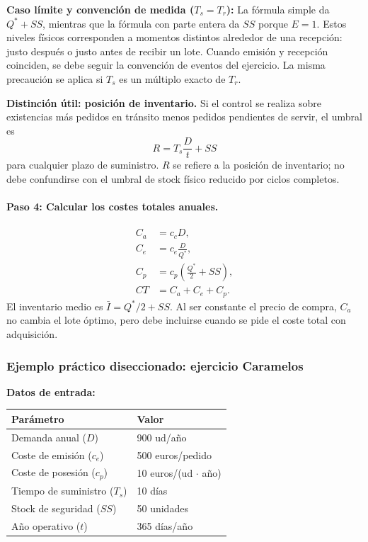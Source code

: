 \documentclass[11pt,a4paper]{article}
\begin{document}
\textbf{Caso límite y convención de medida ($T_s=T_r$):} La fórmula simple da $Q^{*}+SS$, mientras que la fórmula con parte entera da $SS$ porque $E=1$. Estos niveles físicos corresponden a momentos distintos alrededor de una recepción: justo después o justo antes de recibir un lote. Cuando emisión y recepción coinciden, se debe seguir la convención de eventos del ejercicio. La misma precaución se aplica si $T_s$ es un múltiplo exacto de $T_r$.

\textbf{Distinción útil: posición de inventario.} Si el control se realiza sobre existencias más pedidos en tránsito menos pedidos pendientes de servir, el umbral es
\[
    R=T_s\frac{D}{t}+SS
\]
para cualquier plazo de suministro. $R$ se refiere a la posición de inventario; no debe confundirse con el umbral de stock físico reducido por ciclos completos.

\paragraph{Paso 4: Calcular los costes totales anuales.}
\begin{align*}
    C_a & = c_c D,                              \\
    C_e & = c_e\frac{D}{Q^{*}},                 \\
    C_p & = c_p\left(\frac{Q^{*}}{2}+SS\right), \\
    CT  & = C_a+C_e+C_p.
\end{align*}
El inventario medio es $\bar{I}=Q^{*}/2+SS$. Al ser constante el precio de compra, $C_a$ no cambia el lote óptimo, pero debe incluirse cuando se pide el coste total con adquisición.

\subsubsection{Ejemplo práctico diseccionado: ejercicio Caramelos}
\textbf{Datos de entrada:}
\begin{center}
    \renewcommand{\arraystretch}{1.2}
    \begin{tabularx}{\textwidth}{@{}lX@{}}
        \toprule
        Parámetro                    & Valor                     \\
        \midrule
        Demanda anual ($D$)          & 900 ud/año                \\
        Coste de emisión ($c_e$)     & 500 euros/pedido          \\
        Coste de posesión ($c_p$)    & 10 euros/(ud $\cdot$ año) \\
        Tiempo de suministro ($T_s$) & 10 días                   \\
        Stock de seguridad ($SS$)    & 50 unidades               \\
        Año operativo ($t$)          & 365 días/año              \\
        \bottomrule
    \end{tabularx}
\end{center}
\end{document}
